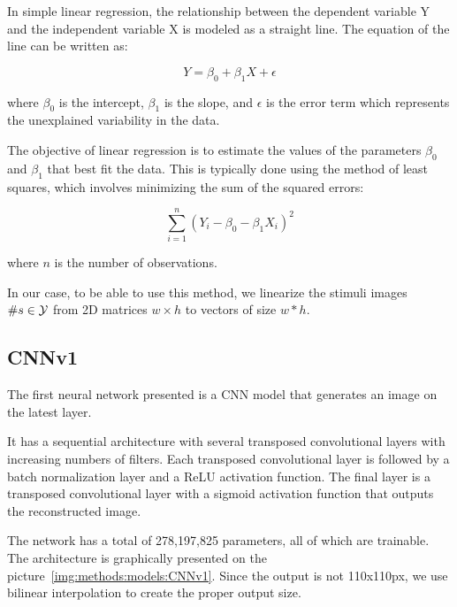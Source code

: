 In simple linear regression, the relationship between the dependent variable Y and the independent variable X is modeled as a straight line. The equation of the line can be written as:

\begin{equation}
Y = \beta_0 + \beta_1 X + \epsilon
\end{equation}

where $\beta_0$ is the intercept, $\beta_1$ is the slope, and $\epsilon$ is the error term which represents the unexplained variability in the data.

The objective of linear regression is to estimate the values of the parameters $\beta_0$ and $\beta_1$ that best fit the data. This is typically done using the method of least squares, which involves minimizing the sum of the squared errors:

\begin{equation}
\sum_{i=1}^{n}(Y_i - \beta_0 - \beta_1 X_i)^2
\end{equation}

where $n$ is the number of observations.

In our case, to be able to use this method, we linearize the stimuli images $\#{s} \in {\cal Y}$ from 2D matrices $w \times h$ to vectors of size $w * h$.


\subsection{CNNv1}
\label{methods:models:CNNv1}
The first neural network presented is a CNN model that generates an image on the latest layer. 

It has a sequential architecture with several transposed convolutional layers with increasing numbers of filters. Each transposed convolutional layer is followed by a batch normalization layer and a ReLU activation function. The final layer is a transposed convolutional layer with a sigmoid activation function that outputs the reconstructed image.

The network has a total of 278,197,825 parameters, all of which are trainable. The architecture is graphically presented on the picture~\ref{img:methods:models:CNNv1}. Since the output is not 110x110px, we use bilinear interpolation to create the proper output size.

